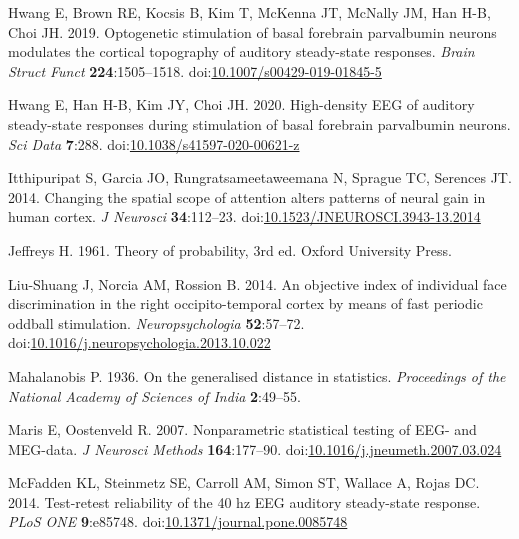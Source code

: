 \documentclass[]{article}
\begin{document}
\leavevmode\hypertarget{ref-Hwang2019}{}%
Hwang E, Brown RE, Kocsis B, Kim T, McKenna JT, McNally JM, Han H-B, Choi JH. 2019. Optogenetic stimulation of basal forebrain parvalbumin neurons modulates the cortical topography of auditory steady-state responses. \emph{Brain Struct Funct} \textbf{224}:1505--1518. doi:\href{https://doi.org/10.1007/s00429-019-01845-5}{10.1007/s00429-019-01845-5}

\leavevmode\hypertarget{ref-Hwang2020}{}%
Hwang E, Han H-B, Kim JY, Choi JH. 2020. High-density EEG of auditory steady-state responses during stimulation of basal forebrain parvalbumin neurons. \emph{Sci Data} \textbf{7}:288. doi:\href{https://doi.org/10.1038/s41597-020-00621-z}{10.1038/s41597-020-00621-z}

\leavevmode\hypertarget{ref-Itthipuripat2014}{}%
Itthipuripat S, Garcia JO, Rungratsameetaweemana N, Sprague TC, Serences JT. 2014. Changing the spatial scope of attention alters patterns of neural gain in human cortex. \emph{J Neurosci} \textbf{34}:112--23. doi:\href{https://doi.org/10.1523/JNEUROSCI.3943-13.2014}{10.1523/JNEUROSCI.3943-13.2014}

\leavevmode\hypertarget{ref-Jeffreys1961}{}%
Jeffreys H. 1961. Theory of probability, 3rd ed. Oxford University Press.

\leavevmode\hypertarget{ref-Liu-Shuang2014}{}%
Liu-Shuang J, Norcia AM, Rossion B. 2014. An objective index of individual face discrimination in the right occipito-temporal cortex by means of fast periodic oddball stimulation. \emph{Neuropsychologia} \textbf{52}:57--72. doi:\href{https://doi.org/10.1016/j.neuropsychologia.2013.10.022}{10.1016/j.neuropsychologia.2013.10.022}

\leavevmode\hypertarget{ref-Mahalanobis1936}{}%
Mahalanobis P. 1936. On the generalised distance in statistics. \emph{Proceedings of the National Academy of Sciences of India} \textbf{2}:49--55.

\leavevmode\hypertarget{ref-Maris2007}{}%
Maris E, Oostenveld R. 2007. Nonparametric statistical testing of EEG- and MEG-data. \emph{J Neurosci Methods} \textbf{164}:177--90. doi:\href{https://doi.org/10.1016/j.jneumeth.2007.03.024}{10.1016/j.jneumeth.2007.03.024}

\leavevmode\hypertarget{ref-McFadden2014}{}%
McFadden KL, Steinmetz SE, Carroll AM, Simon ST, Wallace A, Rojas DC. 2014. Test-retest reliability of the 40 hz EEG auditory steady-state response. \emph{PLoS ONE} \textbf{9}:e85748. doi:\href{https://doi.org/10.1371/journal.pone.0085748}{10.1371/journal.pone.0085748}
\end{document}
